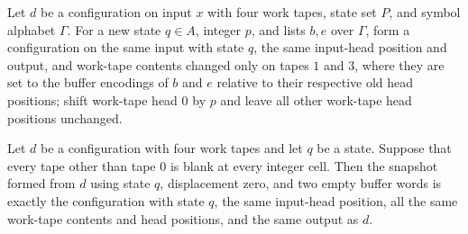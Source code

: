 \begin{definition}
\label{Turing.recordStepSnapshot}
\leanok
{}
Let $d$ be a configuration on input $x$ with four work tapes, state set $P$, and symbol
alphabet $\Gamma$. For a new state $q\in A$, integer $p$, and lists $b,e$ over $\Gamma$,
form a configuration on the same input with state $q$, the same input-head position and
output, and work-tape contents changed only on tapes $1$ and $3$, where they are set to
the buffer encodings of $b$ and $e$ relative to their respective old head positions;
shift work-tape head $0$ by $p$ and leave all other work-tape head positions unchanged.
\end{definition}

\begin{theorem}
\label{Turing.recordStepSnapshot_empty}
\leanok
{}
Let $d$ be a configuration with four work tapes and let $q$ be a state. Suppose that
every tape other than tape $0$ is blank at every integer cell. Then the snapshot formed
from $d$ using state $q$, displacement zero, and two empty buffer words is exactly the
configuration with state $q$, the same input-head position, all the same work-tape
contents and head positions, and the same output as $d$.
\end{theorem}


